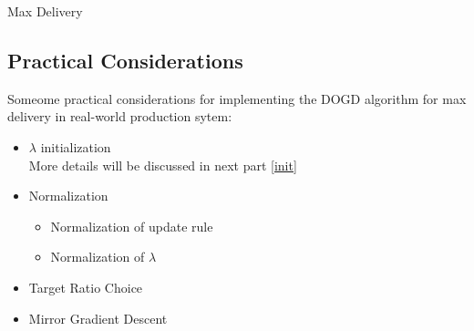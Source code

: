 \documentclass[../main.tex]{subfiles}
\begin{document}
\begin{section}{Max Delivery}
	\subsection*{Practical Considerations} 
		Someome practical considerations for implementing the DOGD algorithm for max delivery in real-world production sytem:
	\begin{itemize}
		\item $\lambda$ initialization \\
		More details will be discussed in next part \autoref{init}
		\item Normalization 
			\begin{itemize}
				\item  Normalization of update rule
				\item  Normalization of $\lambda$ 
			\end{itemize}
		\item Target Ratio Choice 
		\item Mirror Gradient Descent 
	\end{itemize}
	
	\end{section}
\end{document}
